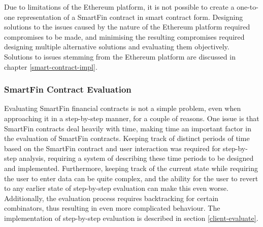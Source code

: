 Due to limitations of the Ethereum platform, it is not possible to create a one-to-one representation of a SmartFin contract in smart contract form. Designing solutions to the issues caused by the nature of the Ethereum platform required compromises to be made, and minimising the resulting compromises required designing multiple alternative solutions and evaluating them objectively. Solutions to issues stemming from the Ethereum platform are discussed in chapter \ref{smart-contract-impl}.


\subsubsection{SmartFin Contract Evaluation}

Evaluating SmartFin financial contracts is not a simple problem, even when approaching it in a step-by-step manner, for a couple of reasons. One issue is that SmartFin contracts deal heavily with time, making time an important factor in the evaluation of SmartFin contracts. Keeping track of distinct periods of time based on the SmartFin contract and user interaction was required for step-by-step analysis, requiring a system of describing these time periods to be designed and implemented. Furthermore, keeping track of the current state while requiring the user to enter data can be quite complex, and the ability for the user to revert to any earlier state of step-by-step evaluation can make this even worse. Additionally, the evaluation process requires backtracking for certain combinators, thus resulting in even more complicated behaviour. The implementation of step-by-step evaluation is described in section \ref{client-evaluate}.